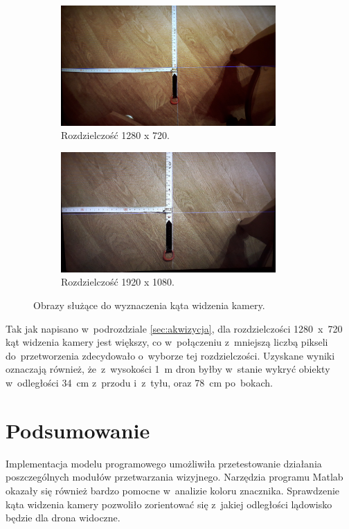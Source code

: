 \begin{figure}
	\centering
	\begin{subfigure}{0.7\textwidth}
		\centering
		\includegraphics[width=0.9\textwidth]{720p.jpg}
		\caption{Rozdzielczość 1280 x 720.}
		\label{fig:1080p}
	\end{subfigure}
	\begin{subfigure}{0.7\textwidth}
		\centering
		\includegraphics[width=0.9\textwidth]{1080p.jpg}
		\caption{Rozdzielczość 1920 x 1080.}
		\label{fig:720p}
	\end{subfigure}
	\caption{Obrazy służące do wyznaczenia kąta widzenia kamery.}
	\label{fig:rozdzielczosc}
\end{figure}

Tak jak napisano w~podrozdziale \ref{sec:akwizycja}, dla rozdzielczości 1280~x~720 kąt widzenia kamery jest większy, co w~połączeniu z~mniejszą liczbą pikseli do~przetworzenia zdecydowało o~wyborze tej rozdzielczości.
Uzyskane wyniki oznaczają również, że~z~wysokości 1~m dron byłby w~stanie wykryć obiekty w~odległości 34~cm z~przodu i~z~tyłu, oraz 78~cm po~bokach.

\section{Podsumowanie}


Implementacja modelu programowego umożliwiła przetestowanie działania poszczególnych modułów przetwarzania wizyjnego. 
Narzędzia programu Matlab okazały się również bardzo pomocne w~analizie koloru znacznika. 
Sprawdzenie kąta widzenia kamery pozwoliło zorientować się z~jakiej odległości lądowisko będzie dla drona widoczne.




